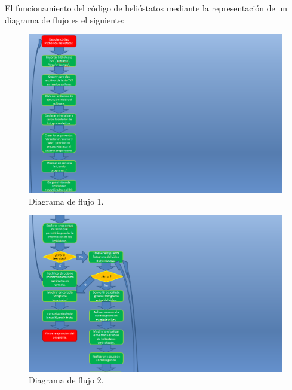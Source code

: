 El funcionamiento del código de helióstatos mediante la representación de un diagrama de flujo es el siguiente:

\begin{figure}[h!]
  	\centering
	\includegraphics[width=\textwidth]{DiagramaFlujoSoftwareTFG/diagramaFlujo1.PNG}
	\caption{Diagrama de flujo 1.
	\label{fig:DiagramaFlujoSoftwareTFG/diagramaFlujo1.PNG}}
\end{figure}

\begin{figure}[h!]
  	\centering
	\includegraphics[width=\textwidth]{DiagramaFlujoSoftwareTFG/diagramaFlujo2.PNG}
	\caption{Diagrama de flujo 2.
	\label{fig:DiagramaFlujoSoftwareTFG/diagramaFlujo2.PNG}}
\end{figure}

